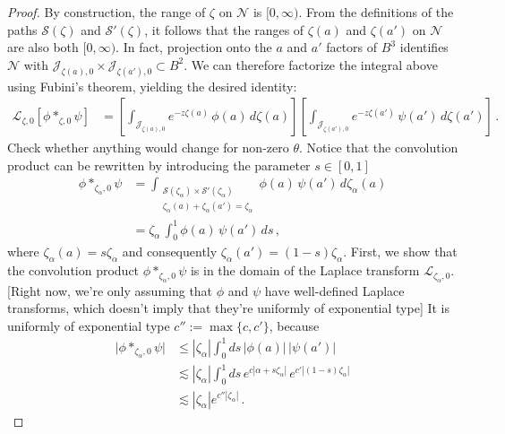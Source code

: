 \documentclass{article}
\newcommand{\laplace}{\mathcal{L}}
\theoremstyle{definition}
\theoremstyle{plain}
\newenvironment{todo}{\color{Coral}}{\color{black}}
\newenvironment{old}{\color{RoyalBlue}}{\color{black}}
\newenvironment{revised}{\color{DarkBlue}}{\color{black}}
\newenvironment{revised}{}{}
\begin{document}
\begin{proof}
\begin{revised}
By construction, the range of $\zeta$ on $\mathcal{N}$ is $[0, \infty)$. From the definitions of the paths $\mathcal{S}(\zeta)$ and $\mathcal{S}'(\zeta)$, it follows that the ranges of $\zeta(a)$ and $\zeta(a')$ on $\mathcal{N}$ are also both $[0, \infty)$. In fact, projection onto the $a$ and $a'$ factors of $B^3$ identifies $\mathcal{N}$ with $\mathcal{J}_{\zeta(a), 0} \times \mathcal{J}_{\zeta(a'), 0} \subset B^2$. We can therefore factorize the integral above using Fubini's theorem, yielding the desired identity:
\begin{align*}
\laplace_{\zeta,0}[{\phi}\ast_{\zeta,0}{\psi}] & = \left[ \int_{\mathcal{J}_{\zeta(a), 0}} e^{-z\zeta(a)}\,\phi(a)\,d\zeta(a) \right] \left[ \int_{\mathcal{J}_{\zeta(a'), 0}} e^{-z\zeta(a')}\,\psi(a')\,d\zeta(a') \right]\,.
\end{align*}
\end{revised}
\begin{old}
\begin{todo}Check whether anything would change for non-zero $\theta$.\end{todo} Notice that the convolution product can be rewritten by introducing the parameter $s\in [0,1]$
\begin{align*}
\phi \ast_{\zeta_\alpha,0} \psi &= \int_{\substack{\mathcal{S}(\zeta_\alpha) \times \mathcal{S}'(\zeta_\alpha) \\ \zeta_\alpha(a) + \zeta_\alpha(a') = \zeta_\alpha}} \phi(a)\,\psi(a')\,d\zeta_\alpha(a)\\
&=\zeta_\alpha\,\int_0^1 \phi(a)\,\psi(a')\,ds\,,
\end{align*}
where $\zeta_\alpha(a)=s\zeta_\alpha$ and consequently $\zeta_\alpha(a')=(1-s) \zeta_\alpha$.  
First, we show that the convolution product $\phi \ast_{\zeta_\alpha,0} \psi$ is in the domain of the Laplace transform $\laplace_{\zeta_\alpha,0}$. \begin{todo}[Right now, we're only assuming that $\phi$ and $\psi$ have well-defined Laplace transforms, which doesn't imply that they're uniformly of exponential type]\end{todo} It is uniformly of exponential type $c'' := \max\{c, c'\}$, because
\begin{align*}
\big|\phi \ast_{\zeta_\alpha,0} \psi\big|&\leq |\zeta_\alpha|\int_0^1 ds \,|\phi(a)|\,|\psi(a')|\\
&\lesssim |\zeta_\alpha| \int_0^1 ds\, e^{c |\alpha+s\zeta_\alpha|}\,e^{c'|(1-s)\zeta_\alpha|}\\
& \lesssim |\zeta_\alpha|  e^{c'' |\zeta_\alpha|}\,.

\end{align*}
\end{old}
\end{proof}
\end{document}
